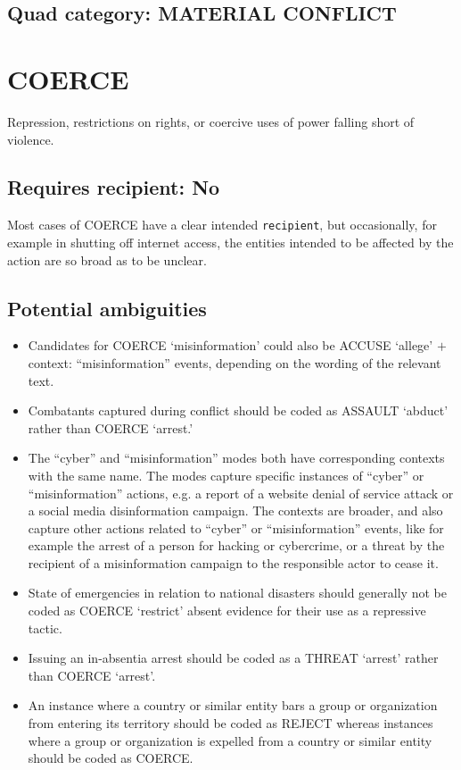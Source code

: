 \documentclass[11pt]{report}
\newcommand{\plcat}[1]{\textsf{#1}}
\newcommand{\txt}[1]{\texttt{#1}}
\begin{document}
\subsection{Quad category: MATERIAL CONFLICT}

\newpage

\section{COERCE}

Repression, restrictions on rights, or coercive uses of power falling short of violence.

\subsection{Requires recipient: No}

Most cases of \plcat{COERCE} have a clear intended \txt{recipient}, but occasionally, for example in shutting off internet access, the entities intended to be affected by the action are so broad as to be unclear.

\subsection{Potential ambiguities}

\begin{itemize}
\item Candidates for \plcat{COERCE} `misinformation' could also be \plcat{ACCUSE} `allege' $+$ context: ``misinformation'' events, depending on the wording of the relevant text.
\item Combatants captured during conflict should be coded as \plcat{ASSAULT} `abduct' rather than \plcat{COERCE} `arrest.'
\item The ``cyber'' and ``misinformation'' modes both have corresponding contexts with the same name. The modes capture specific instances of ``cyber'' or ``misinformation'' actions, e.g. a report of a website denial of service attack or a social media disinformation campaign. The contexts are broader, and also capture other actions related to ``cyber'' or ``misinformation'' events, like for example the arrest of a person for hacking or cybercrime, or a threat by the recipient of a misinformation campaign to the responsible actor to cease it.
\item State of emergencies in relation to national disasters should generally not be coded as \plcat{COERCE} `restrict' absent evidence for their use as a repressive tactic.
\item Issuing an in-absentia arrest should be coded as a \plcat{THREAT} `arrest' rather than \plcat{COERCE} `arrest'.
\item An instance where a country or similar entity bars a group or organization from entering its territory should be coded as \plcat{REJECT} whereas instances where a group or organization is expelled from a country or similar entity should be coded as \plcat{COERCE}.
\end{itemize}
\end{document}
